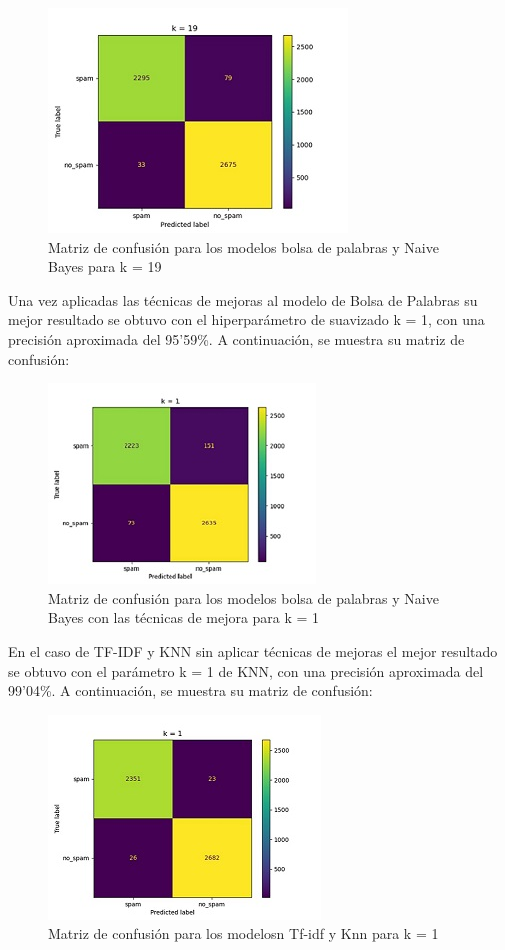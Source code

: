 \documentclass[conference,a4paper]{IEEEtran}
\begin{document}
\begin{figure}[hbtp]
\caption{Matriz de confusión para los modelos bolsa de palabras y Naive Bayes para k = 19}
\centering
\includegraphics[scale=1]{bow.jpg}
\end{figure}

\newpage

Una vez aplicadas las técnicas de mejoras al modelo de Bolsa de Palabras su mejor resultado se obtuvo con el hiperparámetro de suavizado k = 1, con una precisión aproximada del 95’59\%. A continuación, se muestra su matriz de confusión:

\begin{figure}[hbtp]
\caption{Matriz de confusión para los modelos bolsa de palabras y Naive Bayes con las técnicas de mejora para k = 1}
\centering
\includegraphics[scale=1]{bowCM.jpg}
\end{figure}


En el caso de TF-IDF y KNN sin aplicar técnicas de mejoras el mejor resultado se obtuvo con el parámetro k = 1 de KNN, con una precisión aproximada del 99’04\%. A continuación, se muestra su matriz de confusión:



\begin{figure}[hbtp]
\caption{Matriz de confusión para los modelosn Tf-idf y Knn para k = 1}
\centering
\includegraphics[scale=1]{tf-idef.jpg}
\end{figure}
\end{document}
